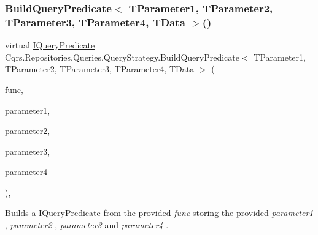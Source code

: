 \subsubsection{\texorpdfstring{Build\+Query\+Predicate$<$ T\+Parameter1, T\+Parameter2, T\+Parameter3, T\+Parameter4, T\+Data $>$()}{BuildQueryPredicate< TParameter1, TParameter2, TParameter3, TParameter4, TData >()}}
{\footnotesize\ttfamily virtual \hyperlink{interfaceCqrs_1_1Repositories_1_1Queries_1_1IQueryPredicate}{I\+Query\+Predicate} Cqrs.\+Repositories.\+Queries.\+Query\+Strategy.\+Build\+Query\+Predicate$<$ T\+Parameter1, T\+Parameter2, T\+Parameter3, T\+Parameter4, T\+Data $>$ (\begin{DoxyParamCaption}\item[{Func$<$ T\+Parameter1, T\+Parameter2, T\+Parameter3, T\+Parameter4, T\+Data $>$}]{func,  }\item[{T\+Parameter1}]{parameter1,  }\item[{T\+Parameter2}]{parameter2,  }\item[{T\+Parameter3}]{parameter3,  }\item[{T\+Parameter4}]{parameter4 }\end{DoxyParamCaption})\hspace{0.3cm}{\ttfamily [protected]}, {\ttfamily [virtual]}}



Builds a \hyperlink{interfaceCqrs_1_1Repositories_1_1Queries_1_1IQueryPredicate}{I\+Query\+Predicate} from the provided {\itshape func}  storing the provided {\itshape parameter1} , {\itshape parameter2} , {\itshape parameter3}  and {\itshape parameter4} . 

\mbox{\label{classCqrs_1_1Repositories_1_1Queries_1_1QueryStrategy_a78a10741d78134a528b6e159a5b72401_a78a10741d78134a528b6e159a5b72401}} 
